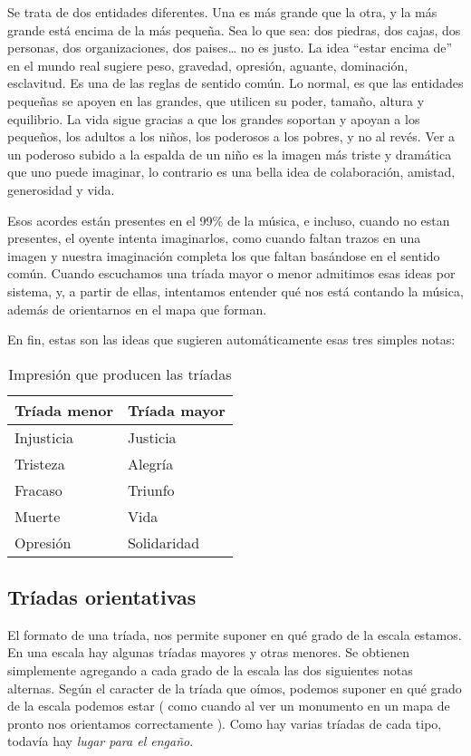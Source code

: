 \documentclass[]{article}
\begin{document}
Se trata de dos entidades diferentes. Una es más grande que la otra, y la más grande está encima de la más pequeña. Sea lo que sea: dos piedras, dos cajas, dos personas, dos organizaciones, dos paises\ldots{} no es justo. La idea ``estar encima de'' en el mundo real sugiere peso, gravedad, opresión, aguante, dominación, esclavitud. Es una de las reglas de sentido común. Lo normal, es que las entidades pequeñas se apoyen en las grandes, que utilicen su poder, tamaño, altura y equilibrio. La vida sigue gracias a que los grandes soportan y apoyan a los pequeños, los adultos a los niños, los poderosos a los pobres, y no al revés. Ver a un poderoso subido a la espalda de un niño es la imagen más triste y dramática que uno puede imaginar, lo contrario es una bella idea de colaboración, amistad, generosidad y vida.

Esos acordes están presentes en el 99\% de la música, e incluso, cuando no estan presentes, el oyente intenta imaginarlos, como cuando faltan trazos en una imagen y nuestra imaginación completa los que faltan basándose en el sentido común. Cuando escuchamos una tríada mayor o menor admitimos esas ideas por sistema, y, a partir de ellas, intentamos entender qué nos está contando la música, además de orientarnos en el mapa que forman.

En fin, estas son las ideas que sugieren automáticamente esas tres simples notas:

\begin{table}[htbp]
  \centering
  \begin{tabular}{ll}
    \toprule
    \textbf{Tríada menor} & \textbf{Tríada mayor} \\
    \midrule
    Injusticia  & Justicia \\
    Tristeza    & Alegría \\
    Fracaso & Triunfo \\
    Muerte  & Vida \\
    Opresión    & Solidaridad \\
    \bottomrule
  \end{tabular}
  \caption{Impresión que producen las tríadas}
  \label{tab:triad-impressions}
\end{table}

\subsection{Tríadas orientativas}

El formato de una tríada, nos permite suponer en qué grado de la escala estamos. En una escala hay algunas tríadas mayores y otras menores. Se obtienen simplemente agregando a cada grado de la escala las dos siguientes notas alternas. Según el caracter de la tríada que oímos, podemos suponer en qué grado de la escala podemos estar ( como cuando al ver un monumento en un mapa de pronto nos orientamos correctamente ). Como hay varias tríadas de cada tipo, todavía hay \emph{lugar para el   engaño}.
\end{document}
